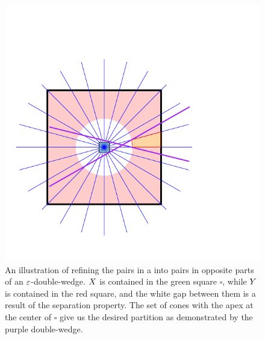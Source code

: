 \documentclass[12pt]{article}%
\begin{document}
\begin{figure}[ht]
    \centerline{\includegraphics{figs/partition}}
    \caption{An illustration of refining the pairs in a \SSPD into
       pairs in opposite parts of an $\varepsilon$-double-wedge. $X$ is
       contained in the green square $\square$, while $Y$ is
       contained in the red square, and the white gap between them is
       a result of the separation property. The set of cones with the
       apex at the center of $\square$ give us the desired partition
       as demonstrated by the purple double-wedge. }
\end{figure}
\end{document}
